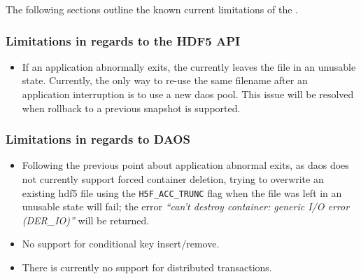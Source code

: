 \documentclass[../users_guide.tex]{subfiles}
\begin{document}
The following sections outline the known current limitations of the \dvc{}.

\subsubsection{Limitations in regards to the HDF5 API}

\begin{itemize}
 \item If an application abnormally exits, the \dvc{} currently leaves the file in an unusable state. Currently, the only way to re-use the same filename after an application interruption is to use a new \acrshort{daos} pool. This issue will be resolved when rollback
to a previous snapshot is supported.
\end{itemize}

\subsubsection{Limitations in regards to DAOS}

\begin{itemize}
 \item Following the previous point about application abnormal exits, as \acrshort{daos} does not currently support forced container deletion, trying to overwrite an existing \acrshort{hdf5} file using the \texttt{H5F\_ACC\_TRUNC} flag when the file was left in an unusable state will fail; the error \textit{``can't destroy container: generic I/O error (DER\_IO)''} will be returned.
\item No support for conditional key insert/remove.
\item There is currently no support for distributed transactions.
\end{itemize}
\end{document}
